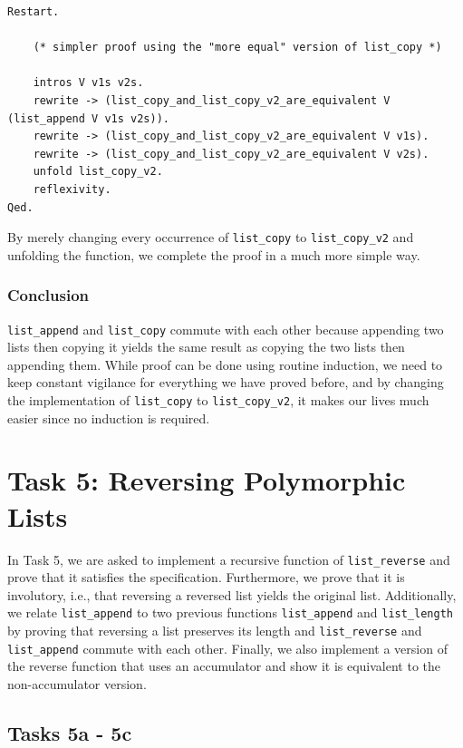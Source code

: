 \documentclass{article}
\begin{document}
\begin{lstlisting}
Restart.

    (* simpler proof using the "more equal" version of list_copy *)
    
    intros V v1s v2s.
    rewrite -> (list_copy_and_list_copy_v2_are_equivalent V (list_append V v1s v2s)).
    rewrite -> (list_copy_and_list_copy_v2_are_equivalent V v1s).
    rewrite -> (list_copy_and_list_copy_v2_are_equivalent V v2s).
    unfold list_copy_v2.
    reflexivity.
Qed.
\end{lstlisting}

By merely changing every occurrence of \texttt{list\_copy} to \texttt{list\_copy\_v2} and unfolding the function, we complete the proof in a much more simple way.

\subsubsection{Conclusion}
\texttt{list\_append} and \texttt{list\_copy} commute with each other because appending two lists then copying it yields the same result as copying the two lists then appending them. While proof can be done using routine induction, we need to keep constant vigilance for everything we have proved before, and by changing the implementation of \texttt{list\_copy} to \texttt{list\_copy\_v2}, it makes our lives much easier since no induction is required.

\newpage

\section{Task 5: Reversing Polymorphic Lists}
In Task 5, we are asked to implement a recursive function of \texttt{list\_reverse} and prove that it satisfies the specification. Furthermore, we prove that it is involutory, i.e., that reversing a reversed list yields the original list. Additionally, we relate \texttt{list\_append} to two previous functions \texttt{list\_append} and \texttt{list\_length} by proving that reversing a list preserves its length and \texttt{list\_reverse} and \texttt{list\_append} commute with each other. Finally, we also implement a version of the reverse function that uses an accumulator and show it is equivalent to the non-accumulator version.

\subsection{Tasks 5a - 5c}
\end{document}
